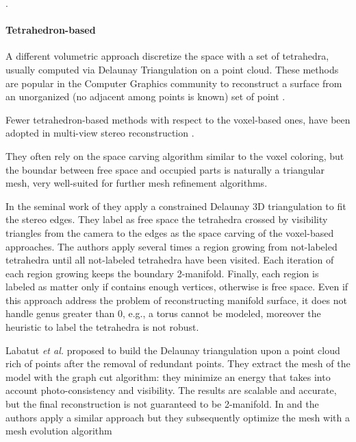 .
\paragraph{Tetrahedron-based}
\label{sec:tet-based}
A different volumetric approach discretize the space with a set of tetrahedra, usually computed via Delaunay Triangulation on a point cloud.
These methods are popular in the Computer Graphics community to reconstruct a surface from an unorganized (no adjacent among points is known) set of point \cite{amenta1999surface,amenta2001power,boissonnat1984geometric,dey2004provable,kolluri2004spectral}. 

Fewer tetrahedron-based methods with respect to the voxel-based ones, have been adopted in multi-view stereo reconstruction
\cite{faugeras_et_al_90,labatut2007efficient,salman2010surface,vu_et_al_2012,hiep2009towards,Pan_et_al09}.

They often rely on the space carving algorithm similar to the voxel coloring, but the boundar between free space and occupied parts is naturally a triangular mesh, very well-suited for further mesh refinement algorithms.

In the seminal work of \cite{faugeras_et_al_90} they apply a constrained Delaunay 3D triangulation to fit the stereo edges. They label  as free space the tetrahedra crossed by visibility triangles from the camera to the edges as the space carving of the voxel-based approaches. The authors apply several times a region growing from not-labeled tetrahedra  until all not-labeled tetrahedra have been visited. Each iteration of each region growing keeps the boundary 2-manifold. Finally, each region is labeled as matter only if contains enough vertices, otherwise is free space. 
Even if this approach address the problem of reconstructing manifold surface, it does not handle genus greater than 0, e.g., a torus cannot be modeled, moreover the heuristic to label the tetrahedra is not robust.

Labatut \emph{et al.} \cite{labatut2007efficient} proposed to build the Delaunay triangulation upon a point cloud rich of points after the removal of redundant points. 
They extract the mesh of the model with the graph cut algorithm: they minimize an energy that takes into account photo-consistency and visibility. The results are scalable and accurate, but the final reconstruction is not guaranteed to be 2-manifold.
In \cite{hiep2009towards} and \cite{vu_et_al_2012} the authors apply a similar approach but they subsequently optimize the mesh with a mesh evolution algorithm


